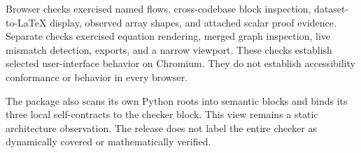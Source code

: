 Browser checks exercised named flows, cross-codebase block inspection, dataset-to-LaTeX display, observed array shapes, and attached scalar proof evidence. Separate checks exercised equation rendering, merged graph inspection, live mismatch detection, exports, and a narrow viewport. These checks establish selected user-interface behavior on Chromium. They do not establish accessibility conformance or behavior in every browser.

The package also scans its own Python roots into semantic blocks and binds its three local self-contracts to the checker block. This view remains a static architecture observation. The release does not label the entire checker as dynamically covered or mathematically verified.

